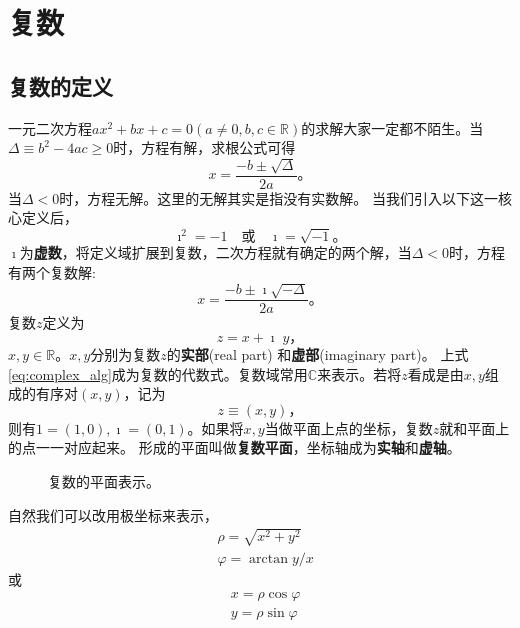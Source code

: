 
\section{复数}

\subsection{复数的定义}
一元二次方程$a x^2 + b x + c = 0 (a\neq 0, b,c \in \mathbb{R})$的求解大家一定都不陌生。当$\Delta \equiv b^2 - 4 a c \geq 0$时，方程有解，求根公式可得
\begin{equation}
    x = \frac{-b \pm \sqrt{\Delta}}{2a} \textrm{。}
\end{equation}
当$\Delta < 0$时，方程无解。这里的无解其实是指没有实数解。
当我们引入以下这一核心定义后，
\begin{equation}
    \imath ^2 = -1 \quad \textrm{或} \quad \imath = \sqrt{-1} \textrm{。} 
\end{equation}
$\imath$为{\bf 虚数}，将定义域扩展到复数，二次方程就有确定的两个解，当$\Delta < 0$时，方程有两个复数解:
\begin{equation}
    x = \frac{-b \pm \imath \sqrt{-\Delta}}{2a} \textrm{。}
\end{equation}
复数$z$定义为
\begin{equation}
    \label{eq:complex_alg}
    z = x + \imath \; y \textrm{，}
\end{equation}
$x,y \in {\mathbb{R}}$。$x,y$分别为复数$z$的{\bf 实部}(real part) 和{\bf 虚部}(imaginary part)。
上式\eqref{eq:complex_alg}成为复数的代数式。复数域常用$\mathbb{C}$来表示。若将$z$看成是由$x,y$组成的有序对$(x,y)$，记为
\begin{equation}
    z \equiv (x,y)\textrm{，}
\end{equation}
则有$1 = (1,0), \imath = (0, 1)$。如果将$x,y$当做平面上点的坐标，复数$z$就和平面上的点一一对应起来。
形成的平面叫做{\bf 复数平面}，坐标轴成为{\bf 实轴}和{\bf 虚轴}。
\begin{figure}[htb]
    \centering
    
  \caption{复数的平面表示。} \label{fig:complex_plane}
\end{figure} 
自然我们可以改用极坐标来表示，
\begin{align}
    & \rho = \sqrt{x^2 + y^2}\\
    & \varphi = \arctan y/x
\end{align}
或
\begin{align}
    & x = \rho \cos\varphi \\
    & y = \rho \sin\varphi 
\end{align}
